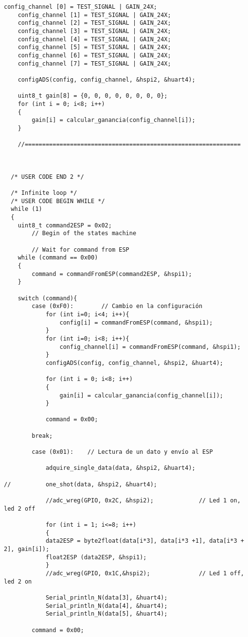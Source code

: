 \begin{lstlisting}[label=algoritmo:STM32F4:main.c,style = STM-code,frame=single,caption=STM32F4:main.c]
	config_channel [0] = TEST_SIGNAL | GAIN_24X;
	config_channel [1] = TEST_SIGNAL | GAIN_24X;
	config_channel [2] = TEST_SIGNAL | GAIN_24X;
	config_channel [3] = TEST_SIGNAL | GAIN_24X;
	config_channel [4] = TEST_SIGNAL | GAIN_24X;
	config_channel [5] = TEST_SIGNAL | GAIN_24X;
	config_channel [6] = TEST_SIGNAL | GAIN_24X;
	config_channel [7] = TEST_SIGNAL | GAIN_24X;
	
	configADS(config, config_channel, &hspi2, &huart4);
	
	uint8_t gain[8] = {0, 0, 0, 0, 0, 0, 0, 0};
	for (int i = 0; i<8; i++)
	{
		gain[i] = calcular_ganancia(config_channel[i]);
	}
	
	//==============================================================



  /* USER CODE END 2 */

  /* Infinite loop */
  /* USER CODE BEGIN WHILE */
  while (1)
  {
	uint8_t command2ESP = 0x02;
		// Begin of the states machine
		
		// Wait for command from ESP
	while (command == 0x00)
	{
		command = commandFromESP(command2ESP, &hspi1);
	}
	
	switch (command){
		case (0xF0):		// Cambio en la configuración
			for (int i=0; i<4; i++){
				config[i] = commandFromESP(command, &hspi1);
			}
			for (int i=0; i<8; i++){
				config_channel[i] = commandFromESP(command, &hspi1);
			}
			configADS(config, config_channel, &hspi2, &huart4);
			
			for (int i = 0; i<8; i++)
			{
				gain[i] = calcular_ganancia(config_channel[i]);
			}
			
			command = 0x00;
			
		break;
			
		case (0x01):	// Lectura de un dato y envío al ESP
		
			adquire_single_data(data, &hspi2, &huart4);
			
//			one_shot(data, &hspi2, &huart4);
		
			//adc_wreg(GPIO, 0x2C, &hspi2);				// Led 1 on, led 2 off	
			
			for (int i = 1; i<=8; i++)
			{					
			data2ESP = byte2float(data[i*3], data[i*3 +1], data[i*3 + 2], gain[i]);
			float2ESP (data2ESP, &hspi1);
			}
			//adc_wreg(GPIO, 0x1C,&hspi2);				// Led 1 off, led 2 on			
			
			Serial_println_N(data[3], &huart4);
			Serial_println_N(data[4], &huart4);
			Serial_println_N(data[5], &huart4);
			
		command = 0x00;
				

\end{lstlisting}
